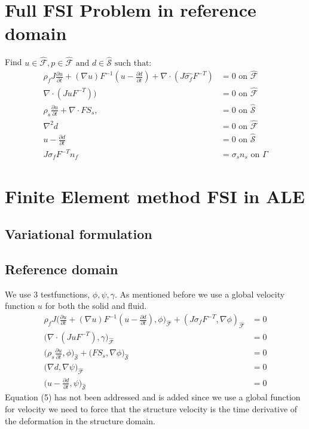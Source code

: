 \section*{ Full FSI Problem in reference domain}
Find $u \in \hat{\mathcal{F}} , p \in \hat{\mathcal{F}} \text{  and  } d \in \hat{\mathcal{S}} \text{  such that}:$ 
\begin{align}
\rho_f J \frac{\partial u}{\partial t} + (\nabla u)F^{-1}(u-\frac{\partial d}{\partial t})  + \nabla \cdot( J \hat{\sigma_f} F^{-T})  &= 0 \text{  on  } \hat{\mathcal{F}} \\
\nabla \cdot (J u F^{-T})\big) &= 0 \text{  on  } \hat{\mathcal{F}}   \\
\rho_s \frac{\partial u}{\partial t} + \nabla \cdot F S_s,&=0  \text{  on  } \hat{\mathcal{S}}\\
\nabla^2 d &= 0  \text{  on  } \hat{\mathcal{F}}\\
u- \frac{\partial d}{\partial t}  &= 0  \text{  on  } \hat{\mathcal{S}}\\
J\sigma_f F^{-T} n_f &= \sigma_s  n_s \text{  on  } \Gamma
\end{align}



\section*{Finite Element method FSI in ALE}
\subsection*{Variational formulation}
\subsection*{Reference domain}
We use 3 testfunctions, $\phi, \psi, \gamma$. As mentioned before we use a global velocity function $u$ for both the solid and fluid.
\begin{align}
\rho_f J \big( \frac{\partial u}{\partial t} + (\nabla u)F^{-1}(u-\frac{\partial d}{\partial t}) , \phi\big)_{\mathcal{\hat{F}}} + (J\sigma_f F^{-T},\nabla \phi )_{\mathcal{\hat{F}}} &= 0  \\
 \big( \nabla \cdot (J u F^{-T}),\gamma \big)_{\mathcal{\hat{F}}} &= 0 \\
\big(\rho_s \frac{\partial u}{\partial t},\phi \big)_{\mathcal{\hat{S}}} + \big(F S_s, \nabla \phi \big)_{\mathcal{\hat{S}}} &=0 \\
 \big( \nabla d , \nabla \psi \big)_{\mathcal{\hat{F}}} &= 0 \\
 \big( u- \frac{\partial d}{\partial t} ,\psi \big)_{\mathcal{\hat{S}}} &= 0 
\end{align}
Equation (5) has not been addressed and is added since we use a global function for velocity we need to force that the structure velocity is the time derivative of the deformation in the structure domain. 

